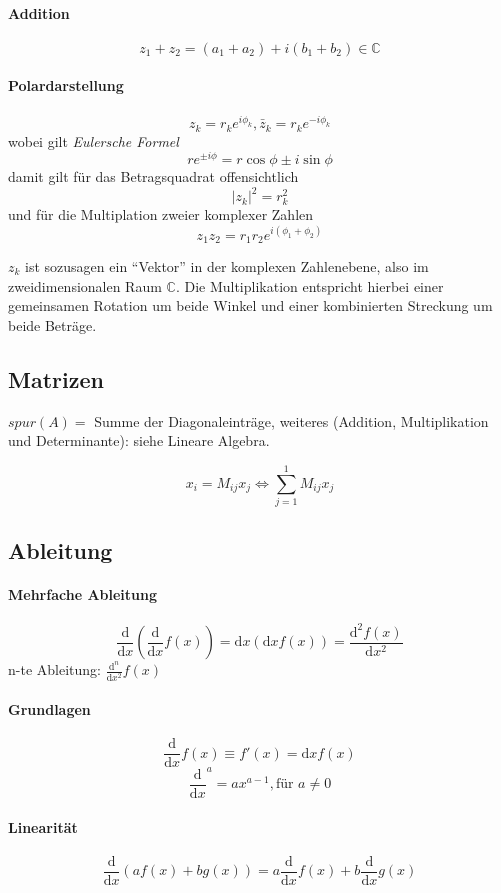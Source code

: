 \documentclass[oneside]{book}
\theoremstyle{definition}
\newcommand\setC{\mathbb C}
\renewcommand{\d}{\mathrm d}
\newcommand{\dd}[1]{\frac{\d}{\d #1}}
\begin{document}
\paragraph{Addition} $$z_1 + z_2 = (a_1 + a_2) + i(b_1 + b_2) \in \setC$$

\paragraph{Polardarstellung}
$$z_k = r_k e^{i \phi_k}, \bar z_k = r_k e^{-i\phi_k}$$
wobei gilt \textit{Eulersche Formel}
$$r e^{\pm i \phi} = r \cos\phi \pm i \sin\phi$$
damit gilt für das Betragsquadrat offensichtlich
$$|z_k|^2 = r_k^2$$
und für die Multiplation zweier komplexer Zahlen
$$z_1 z_2 = r_1 r_2 e^{i (\phi_1 + \phi_2)}$$

$z_k$ ist sozusagen ein "`Vektor"' in der komplexen Zahlenebene, also im zweidimensionalen Raum $\setC$. Die Multiplikation entspricht hierbei einer gemeinsamen Rotation um beide Winkel und einer kombinierten Streckung um beide Beträge.  

\subsection{Matrizen}
$spur(A) = $ Summe der Diagonaleinträge, weiteres (Addition, Multiplikation und Determinante): siehe Lineare Algebra.

$$x_i = M_{ij} x_j \Leftrightarrow \sum_{j=1}^1 M_{ij} x_j$$

\subsection{Ableitung}

\paragraph{Mehrfache Ableitung}
$$\dd x (\dd x f(x)) = \d x (\d x f(x)) = \frac{\d^2 f(x)}{\d x^2}$$
n-te Ableitung: $\frac{\d^n}{\d x^2} f(x)$

\paragraph{Grundlagen}
$$\dd x f(x) \equiv f'(x) = \d x f(x)$$
$$\dd x^a = a x^{a-1}, \text{für $a \neq 0$}$$

\paragraph{Linearität}
$$\dd x (a f(x) + b g(x)) = a \dd x f(x) + b \dd x g(x)$$
\end{document}
